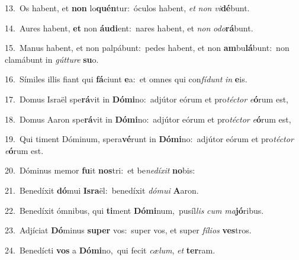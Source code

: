 {\numbfont\textcolor{\numbcolor}{13.}}~Os habent, et \textbf{non} lo\-\textbf{quén}\-tur:~\star óculos habent, \textit{et} \textit{non} \textit{vi}\-\textbf{dé}bunt.\par
{\numbfont\textcolor{\numbcolor}{14.}}~Aures habent, \textbf{et} non \textbf{áu}\-\textbf{di}ent:~\star nares habent, et \textit{non} \textit{o}\-\textit{do}\textbf{rá}bunt.\par
{\numbfont\textcolor{\numbcolor}{15.}}~Manus habent, et non palpábunt:~\dagger pedes habent, et non \textbf{am}\-bu\-\textbf{lá}\-bunt:~\star non clamábunt in \textit{gút}\-\textit{tu}\textit{re} \textbf{su}\-o.\par
{\numbfont\textcolor{\numbcolor}{16.}}~Símiles illis fiant qui \textbf{fá}\-ciunt \textbf{e}\-a:~\star et omnes qui con\-\textit{fí}\-\textit{dunt} \textit{in} \textbf{e}\-is.\par
{\numbfont\textcolor{\numbcolor}{17.}}~Domus Israël spe\-\textbf{rá}\-vit in \textbf{Dó}\-\textbf{mi}no:~\star adjútor eórum et pro\-\textit{téc}\-\textit{tor} \textit{e}\-\textbf{ó}rum est,\par
{\numbfont\textcolor{\numbcolor}{18.}}~Domus Aaron spe\-\textbf{rá}\-vit in \textbf{Dó}\-\textbf{mi}no:~\star adjútor eórum et pro\-\textit{téc}\-\textit{tor} \textit{e}\-\textbf{ó}rum est,\par
{\numbfont\textcolor{\numbcolor}{19.}}~Qui timent Dóminum, spera\-\textbf{vé}\-runt in \textbf{Dó}\-\textbf{mi}no:~\star adjútor eórum et pro\-\textit{téc}\-\textit{tor} \textit{e}\-\textbf{ó}rum est.\par
{\numbfont\textcolor{\numbcolor}{20.}}~Dóminus memor \textbf{fu}\-it \textbf{nos}\-tri:~\star et be\-\textit{ne}\-\textit{dí}\textit{xit} \textbf{no}\-bis:\par
{\numbfont\textcolor{\numbcolor}{21.}}~Benedíxit \textbf{dó}\-mui \textbf{Is}\-\textbf{ra}ël:~\star benedíxit \textit{dó}\-\textit{mu}\textit{i} \textbf{A}\-aron.\par
{\numbfont\textcolor{\numbcolor}{22.}}~Benedíxit ómnibus, qui \textbf{ti}\-ment \textbf{Dó}\-\textbf{mi}num,~\star pusíl\textit{lis} \textit{cum} \textit{ma}\-\textbf{jó}ribus.\par
{\numbfont\textcolor{\numbcolor}{23.}}~Adjíciat \textbf{Dó}\-minus \textbf{su}\-\textbf{per} vos:~\star super vos, et super \textit{fí}\-\textit{li}\textit{os} \textbf{ves}\-tros.\par
{\numbfont\textcolor{\numbcolor}{24.}}~Benedícti \textbf{vos} a \textbf{Dó}\-\textbf{mi}no,~\star qui fecit \textit{cæ}\-\textit{lum}, \textit{et} \textbf{ter}\-ram.\par
